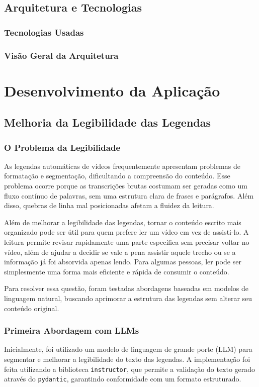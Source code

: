 \documentclass[tcc,capa]{texufpel}
\begin{document}
\section{Arquitetura e Tecnologias}
\subsection{Tecnologias Usadas}
\subsection{Visão Geral da Arquitetura}


\chapter{Desenvolvimento da Aplicação}

\section{Melhoria da Legibilidade das Legendas}

\subsection{O Problema da Legibilidade}
As legendas automáticas de vídeos frequentemente apresentam problemas de formatação e segmentação, dificultando a compreensão do conteúdo. Esse problema ocorre porque as transcrições brutas costumam ser geradas como um fluxo contínuo de palavras, sem uma estrutura clara de frases e parágrafos. Além disso, quebras de linha mal posicionadas afetam a fluidez da leitura.

Além de melhorar a legibilidade das legendas, tornar o conteúdo escrito mais organizado pode ser útil para quem prefere ler um vídeo em vez de assisti-lo. A leitura permite revisar rapidamente uma parte específica sem precisar voltar no vídeo, além de ajudar a decidir se vale a pena assistir aquele trecho ou se a informação já foi absorvida apenas lendo. Para algumas pessoas, ler pode ser simplesmente uma forma mais eficiente e rápida de consumir o conteúdo.

Para resolver essa questão, foram testadas abordagens baseadas em modelos de linguagem natural, buscando aprimorar a estrutura das legendas sem alterar seu conteúdo original.



\subsection{Primeira Abordagem com LLMs}
Inicialmente, foi utilizado um modelo de linguagem de grande porte (LLM) para segmentar e melhorar a legibilidade do texto das legendas. A implementação foi feita utilizando a biblioteca \texttt{instructor}, que permite a validação do texto gerado através do \texttt{pydantic}, garantindo conformidade com um formato estruturado.
\end{document}
